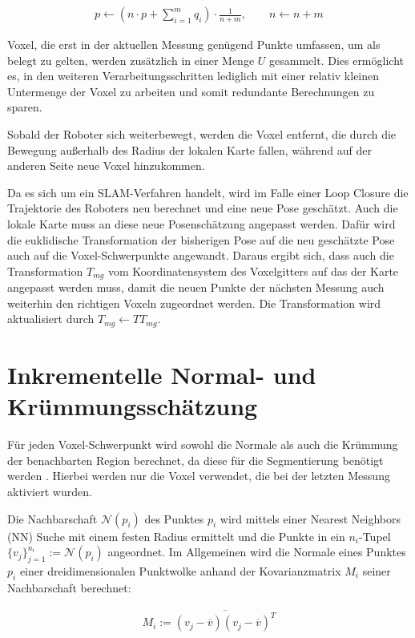 \begin{align}
	p \leftarrow \left( n \cdot p + \sum_{i=1}^{m} q_i \right) \cdot \frac{1}{n + m}, \qquad n \leftarrow n + m
\end{align}


Voxel, die erst in der aktuellen Messung genügend Punkte umfassen, um als belegt zu gelten, werden zusätzlich in einer Menge $ U $ gesammelt. Dies ermöglicht es, in den weiteren Verarbeitungsschritten lediglich mit einer relativ kleinen Untermenge der Voxel zu arbeiten und somit redundante Berechnungen zu sparen.

Sobald der Roboter sich weiterbewegt, werden die Voxel entfernt, die durch die Bewegung außerhalb des Radius der lokalen Karte fallen, während auf der anderen Seite neue Voxel hinzukommen.

Da es sich um ein SLAM-Verfahren handelt, wird im Falle einer Loop Closure die Trajektorie des Roboters neu berechnet und eine neue Pose geschätzt. Auch die lokale Karte muss an diese neue Posenschätzung angepasst werden. Dafür wird die euklidische Transformation der bisherigen Pose auf die neu geschätzte Pose auch auf die Voxel-Schwerpunkte angewandt. Daraus ergibt sich, dass auch die Transformation $ T_{mg} $ vom Koordinatensystem des Voxelgitters auf das der Karte angepasst werden muss, damit die neuen Punkte der nächsten Messung auch weiterhin den richtigen Voxeln zugeordnet werden. Die Transformation wird aktualisiert durch $ T_{mg} \leftarrow TT_{mg} $.  

\section[Inkrementelle Normal- und Krümmungsschätzung (Schmelzer)]{Inkrementelle Normal- und Krümmungsschätzung}

Für jeden Voxel-Schwerpunkt wird sowohl die Normale als auch die Krümmung der benachbarten Region berechnet, da diese für die Segmentierung benötigt werden \cite{Dube2018}. Hierbei werden nur die Voxel verwendet, die bei der letzten Messung aktiviert wurden. 

Die Nachbarschaft $ \mathcal{N}(p_i) $ des Punktes $ p_i $ wird mittels einer Nearest Neighbors (NN) Suche mit einem festen Radius ermittelt und die Punkte in ein $ n_i $-Tupel $ \{v_j\}_{j=1}^{n_i} := \mathcal{N}(p_i) $ angeordnet. Im Allgemeinen wird die Normale eines Punktes $ p_i $ einer dreidimensionalen Punktwolke anhand der Kovarianzmatrix $ M_i $ seiner Nachbarschaft berechnet:

\begin{align}
	\label{kovarianmatrix}
	M_i := \overline{(v_j-\overline{v})(v_j-\overline{v})^T}
\end{align}

